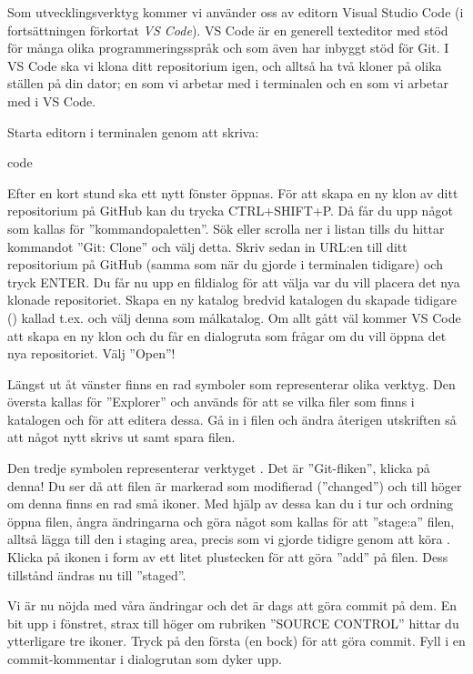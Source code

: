 \begin{Datorarbete}
Som utvecklingsverktyg kommer vi använder oss av editorn Visual Studio Code (i fortsättningen förkortat \emph{VS Code}). VS Code är en generell texteditor med stöd för många olika programmeringsspråk och som även har inbyggt stöd för Git. I VS Code ska vi klona ditt repositorium igen, och alltså ha två kloner på olika ställen på din dator; en som vi arbetar med i terminalen och en som vi arbetar med i VS Code.

Starta editorn i terminalen genom att skriva:
\begin{Code}
code
\end{Code}


Efter en kort stund ska ett nytt fönster öppnas. För att skapa en ny klon av ditt repositorium på GitHub kan du trycka CTRL+SHIFT+P. Då får du upp något som kallas för ''kommandopaletten''. Sök eller scrolla ner i listan tills du hittar kommandot ''Git: Clone'' och välj detta. Skriv sedan in URL:en till ditt repositorium på GitHub (samma som när du gjorde  i terminalen tidigare) och tryck ENTER. Du får nu upp en fildialog för att välja var du vill placera det nya klonade repositoriet. Skapa en ny katalog bredvid katalogen du skapade tidigare () kallad t.ex.  och välj denna som målkatalog. Om allt gått väl kommer VS Code att skapa en ny klon och du får en dialogruta som frågar om du vill öppna det nya repositoriet. Välj ''Open''!

\item Längst ut åt vänster finns en rad symboler som representerar olika verktyg. Den översta kallas för ''Explorer'' och används för att se vilka filer som finns i katalogen och för att editera dessa. Gå in i filen  och ändra återigen utskriften så att något nytt skrivs ut samt spara filen.

Den tredje symbolen representerar verktyget . Det är ''Git-fliken'', klicka på denna! Du ser då att filen   är markerad som modifierad (''changed'') och till höger om denna finns en rad små ikoner. Med hjälp av dessa kan du i tur och ordning öppna filen, ångra ändringarna och göra något som kallas för att ''stage:a'' filen, alltså lägga till den i staging area, precis som vi gjorde tidigre genom att köra . Klicka på ikonen i form av ett litet plustecken för att göra ''add'' på filen. Dess tillstånd ändras nu till ''staged''.

Vi är nu  nöjda med våra ändringar och det är dags att göra commit på dem. En bit upp i fönstret, strax till höger om rubriken ''SOURCE CONTROL'' hittar du ytterligare tre ikoner. Tryck på den första (en bock) för att göra commit. Fyll i en commit-kommentar i dialogrutan som dyker upp.


\end{Datorarbete}
